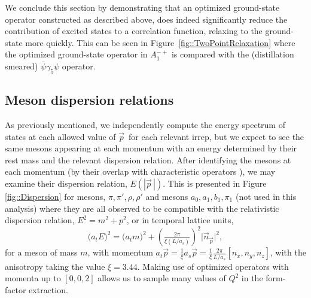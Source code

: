 \documentclass[twocolumn,amsmath,amssymb,prd,10pt,floatfix, 
superscriptaddress,nofootinbib, showpacs, preprintnumbers]{revtex4-1}
\begin{document}
We conclude this section by demonstrating that an optimized ground-state operator constructed as described above, does indeed significantly reduce the contribution of excited states to a correlation function, relaxing to the ground-state more quickly. This can be seen in Figure~\ref{fig::TwoPointRelaxation} where the optimized ground-state operator in $A_1^{-+}$ is compared with the (distillation smeared) $\bar{\psi} \gamma_5 \psi$ operator.


\subsection{Meson dispersion relations \label{ssec::two_points_dispersion}}


As previously mentioned, we independently compute the energy spectrum of states at each allowed value of $\vec{p}\,$ for each relevant irrep, but we expect to see the same mesons appearing at each momentum with an energy determined by their rest mass and the relevant dispersion relation. After identifying the mesons at each momentum (by their overlap with characteristic operators \cite{Thomas:2011rh}), we may examine their dispersion relation, $E(|\vec{p}\,|)$. This is presented in Figure \ref{fig::Dispersion} for mesons, $\pi, \pi', \rho, \rho'$ and mesons $a_0, a_1, b_1, \pi_1$ (not used in this analysis) where they are all observed to be compatible with the relativistic dispersion relation, $E^2 = m^2 + p^2$, or in temporal lattice units,
\begin{equation*}
\big(a_t E\big)^2 =  \big(a_t m\big)^2 + \left(\tfrac{2\pi}{\xi (L/a_s)}\right)^2 \lvert \vec{n}_{\vec{p}} \rvert^2 ,
\end{equation*}
for a meson of mass $m$, with momentum ${a_t \vec{p} = \tfrac{1}{\xi} a_s \vec{p} = \tfrac{1}{\xi} \tfrac{2\pi}{L/a_s}[n_x, n_y, n_z]}$, with the anisotropy taking the value $\xi = 3.44$. Making use of optimized operators with momenta up to $[0,0,2]$ allows us to sample many values of $Q^2$ in the form-factor extraction.
\end{document}
